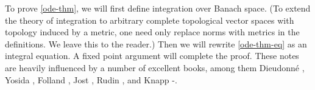 To prove \autoref{ode-thm}, we will first define
integration over Banach space. (To extend the theory of integration
to arbitrary complete topological vector spaces with topology induced by a
metric, one need
only replace norms with metrics in the definitions. We leave this to the
reader.) Then we will rewrite
\eqref{ode-thm-eq} as an integral equation. A fixed point argument will complete
the proof. These notes are heavily influenced by a
number of excellent books, among them Dieudonn{\'e}
\cite{Dieudonne_1969_Foundations-of-}, Yosida \cite{Yosida:1980fk},
Folland \cite{Folland_1999_Real-analysis}, Jost
\cite{Jost-1998-Postmodern-analysis}, Rudin \cite{Rudin:1976uq}, and Knapp
\cite{Knapp:2005rm}-\cite{Knapp:2005yg}.
%
%
%
%
%
%
%
%
%
%
%
%
%
%
